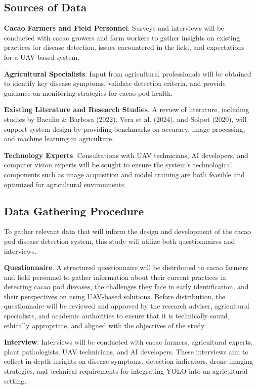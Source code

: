 \subsection*{Sources of Data}
\textbf{Cacao Farmers and Field Personnel}. Surveys and interviews will be conducted with cacao growers and farm workers to gather insights on existing practices for disease detection, issues encountered in the field, and expectations for a UAV-based system. 

\textbf{Agricultural Specialists}. Input from agricultural professionals will be obtained to identify key disease symptoms, validate detection criteria, and provide guidance on monitoring strategies for cacao pod health.

\textbf{Existing Literature and Research Studies}. A review of literature, including studies by Baculio \& Barbosa (2022), Vera et al. (2024), and Solpot (2020), will support system design by providing benchmarks on accuracy, image processing, and machine learning in agriculture.




\textbf{Technology Experts}. Consultations with UAV technicians, AI developers, and computer vision experts will be sought to ensure the system’s technological components such as image acquisition and model training are both feasible and optimized for agricultural environments.

\subsection*{Data Gathering Procedure}

To gather relevant data that will inform the design and development of the cacao pod disease detection system, this study will utilize both questionnaires and interviews.

\textbf{Questionnaire}. A structured questionnaire will be distributed to cacao farmers and field personnel to gather information about their current practices in detecting cacao pod diseases, the challenges they face in early identification, and their perspectives on using UAV-based solutions. Before distribution, the questionnaire will be reviewed and approved by the research adviser, agricultural specialists, and academic authorities to ensure that it is technically sound, ethically appropriate, and aligned with the objectives of the study.

\textbf{Interview}. Interviews will be conducted with cacao farmers, agricultural experts, plant pathologists, UAV technicians, and AI developers. These interviews aim to collect in-depth insights on disease symptoms, detection indicators, drone imaging strategies, and technical requirements for integrating YOLO into an agricultural setting.

